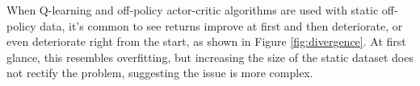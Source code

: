 When Q-learning and off-policy actor-critic algorithms are used with static off-policy data, it's common to see returns improve at first and then deteriorate, or even deteriorate right from the start, as shown in Figure \ref{fig:divergence}. At first glance, this resembles overfitting, but increasing the size of the static dataset does not rectify the problem, suggesting the issue is more complex.
